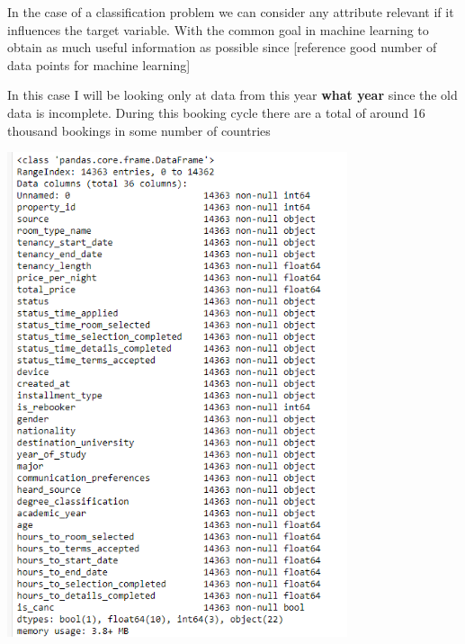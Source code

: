 In the case of a classification problem we can consider any attribute relevant if it influences the target variable. With the common goal in machine learning to obtain as much useful information as possible since [reference good number of data points for machine learning]

In this case I will be looking only at data from this year \textbf{what year} since the old data is incomplete. During this booking cycle there are a total of around 16 thousand bookings  in some number of countries 

\includegraphics[width=10cm]{figures/df_info.png}


